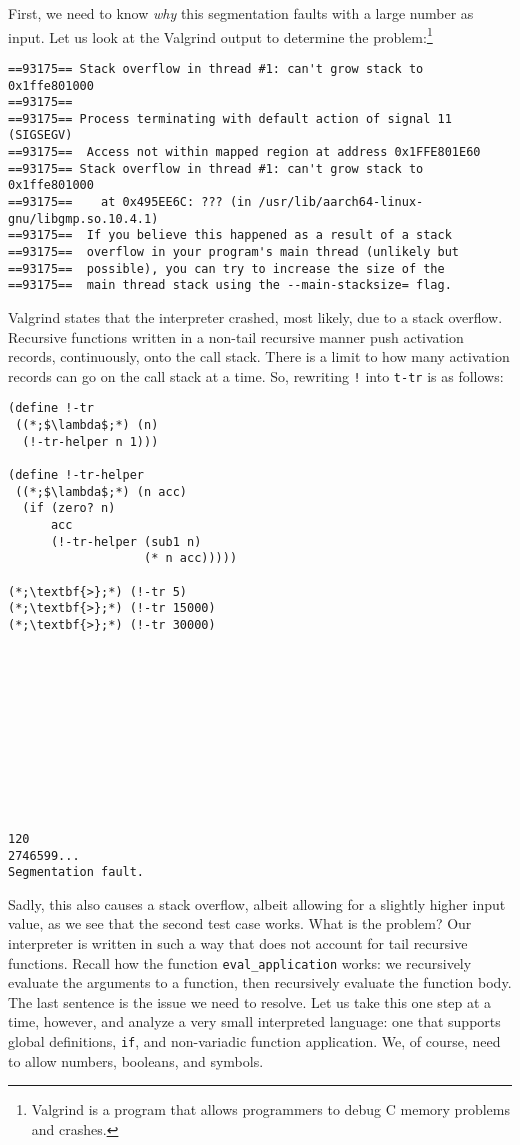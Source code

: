 First, we need to know \textit{why} this segmentation faults with a large number as input. Let us look at the Valgrind output to determine the problem:\footnote{Valgrind is a program that allows programmers to debug C memory problems and crashes.}

\begin{lstlisting}[language=MyOutput]
==93175== Stack overflow in thread #1: can't grow stack to 0x1ffe801000
==93175== 
==93175== Process terminating with default action of signal 11 (SIGSEGV)
==93175==  Access not within mapped region at address 0x1FFE801E60
==93175== Stack overflow in thread #1: can't grow stack to 0x1ffe801000
==93175==    at 0x495EE6C: ??? (in /usr/lib/aarch64-linux-gnu/libgmp.so.10.4.1)
==93175==  If you believe this happened as a result of a stack
==93175==  overflow in your program's main thread (unlikely but
==93175==  possible), you can try to increase the size of the
==93175==  main thread stack using the --main-stacksize= flag.
\end{lstlisting}

Valgrind states that the interpreter crashed, most likely, due to a stack overflow. Recursive functions written in a non-tail recursive manner push activation records, continuously, onto the call stack. There is a limit to how many activation records can go on the call stack at a time. So, rewriting \texttt{!} into \texttt{t-tr} is as follows:

\begin{cloast}[]{}
\begin{lstlisting}[language=MyScheme]
(define !-tr
 ((*;$\lambda$;*) (n)
  (!-tr-helper n 1)))
    
(define !-tr-helper
 ((*;$\lambda$;*) (n acc)
  (if (zero? n)
      acc
      (!-tr-helper (sub1 n) 
                   (* n acc)))))

(*;\textbf{>};*) (!-tr 5)
(*;\textbf{>};*) (!-tr 15000)
(*;\textbf{>};*) (!-tr 30000)
\end{lstlisting}
\tcblower
\begin{lstlisting}[language=MyOutput]











120
2746599...
Segmentation fault.
\end{lstlisting}
\end{cloast}

Sadly, this also causes a stack overflow, albeit allowing for a slightly higher input value, as we see that the second test case works. What is the problem? Our interpreter is written in such a way that does not account for tail recursive functions. Recall how the function \texttt{eval\_application} works: we recursively evaluate the arguments to a function, then recursively evaluate the function body. The last sentence is the issue we need to resolve. Let us take this one step at a time, however, and analyze a very small interpreted language: one that supports global definitions, \texttt{if}, and non-variadic function application. We, of course, need to allow numbers, booleans, and symbols.

